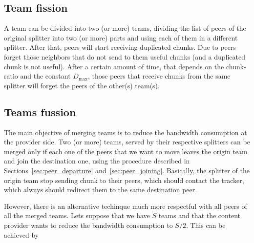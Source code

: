 \subsection{Team fission}
A team can be divided into two (or more) teams, dividing the list of
peers of the original splitter into two (or more) parts and using each
of them in a different splitter. After that, peers will start
receiving duplicated chunks. Due to peers forget those neighbors that
do not send to them useful chunks (and a duplicated chunk is not
useful). After a certain amount of time, that depends on the
chunk-ratio and the constant $D_\text{max}$, those peers that receive
chunks from the same splitter will forget the peers of the other(s)
team(s).

\subsection{Teams fussion}
The main objective of merging teams is to reduce the bandwidth
consumption at the provider side.  Two (or more) teams, served by
their respective splitters can be merged only if each one of the peers
that we want to move leaves the origin team and join the destination
one, using the procedure described in
Sections~\ref{sec:peer_departure}
and~\ref{sec:peer_joining}. Basically, the splitter of the origin team
stop sending chunk to their peers, which should contact the tracker,
which always should redirect them to the same destination peer.

However, there is an alternative techinque much more respectful with
all peers of all the merged teams. Lets suppose that we have $S$ teams
and that the content provider wants to reduce the bandwidth
consumption to $S/2$. This can be achieved by 
